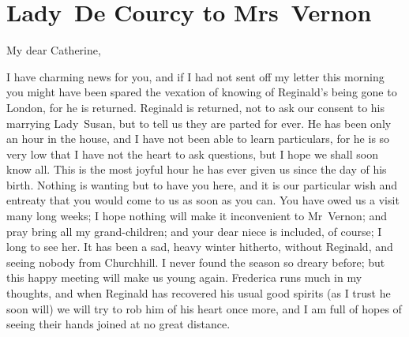 \chapter{Lady~De Courcy to Mrs~Vernon}
  
  	
	\begin{a4}
	\vspace{5em}
	\end{a4}
	
	  	\begin{letter}
\enlargethispage{\baselineskip}
\end{letter}
	
  \begin{mail}{}{My dear Catherine,}

I have charming news for you, and if I had not sent off my letter this morning you might have been spared the vexation of knowing of Reginald's being gone to London, for he is returned. Reginald is returned, not to ask our consent to his marrying Lady~Susan, but to tell us they are parted for ever. He has been only an hour in the house, and I have not been able to learn particulars, for he is so very low that I have not the heart to ask questions, but I hope we shall soon know all. This is the most joyful hour he has ever given us since the day of his birth. Nothing is wanting but to have you here, and it is our particular wish and entreaty that you would come to us as soon as you can. You have owed us a visit many long weeks; I hope nothing will make it inconvenient to Mr~Vernon; and pray bring all my grand-children; and your dear niece is included, of course; I long to see her. It has been a sad, heavy winter hitherto, without Reginald, and seeing nobody from Churchhill. I never found the season so dreary before; but this happy meeting will make us young again. Frederica runs much in my thoughts, and when Reginald has recovered his usual good spirits (as I trust he soon will) we will try to rob him of his heart once more, and I am full of hopes of seeing their hands joined at no great distance. 

\end{mail}